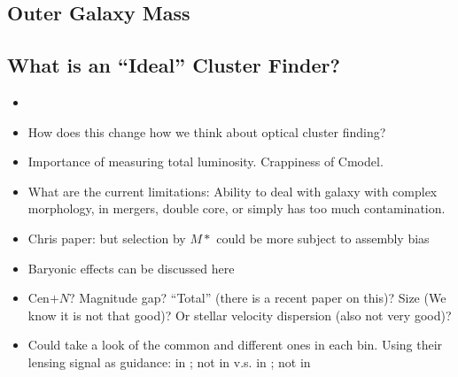 \documentclass[a4paper,fleqn,usenatbib]{mnras}
\begin{document}
\subsection{Outer Galaxy Mass}
    \label{sec:cause_of_difference}



\subsection{What is an ``Ideal'' Cluster Finder?}
    \label{sec:perfect_finder}


    \begin{itemize}

        \item {}

        \item How does this change how we think about optical cluster finding?

        \item Importance of measuring total luminosity. Crappiness of Cmodel.

        \item What are the current limitations: Ability to deal with galaxy with complex
            morphology, in mergers, double core, or simply has too much contamination.


        \item Chris paper: but selection by $M*$ could be more subject to assembly bias

        \item Baryonic effects can be discussed here

        \item Cen$+N$? Magnitude gap? ``Total'' \mstar{} (there is a recent paper on this)?
            Size (We know it is not that good)? Or stellar velocity dispersion (also not very good)?

        \item Could take a look of the common and different ones in each bin. Using their
            lensing signal as guidance: in \redm{}; not in \mstar{} v.s. in \mstar{}; not in \redm{}

    \end{itemize}
\end{document}
